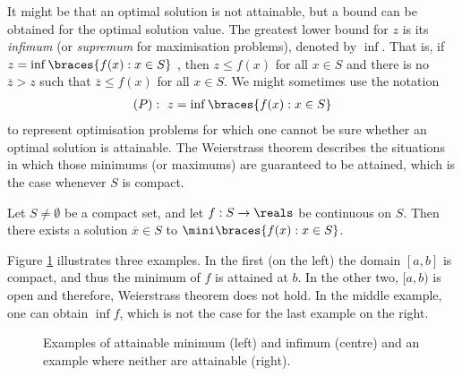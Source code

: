 It might be that an optimal solution is not attainable, but a bound can be obtained for the optimal solution value. The greatest lower bound for $z$ is its \emph{infimum} (or \emph{supremum} for maximisation problems), denoted by $\inf$. That is, if $z = \inf\braces{f(x) : x \in S}$ , then $z \leq f(x)$ for all $x \in S$ and there is no $\overline{z} > z$ such that $\overline{z} \leq f(x)$ for all $x \in S$. We might sometimes use the notation 
%
\begin{align*}
(P) :~ z = \inf\braces{f(x) : x \in S}
\end{align*}
%
to represent optimisation problems for which one cannot be sure whether an optimal solution is attainable. The Weierstrass theorem describes the situations in which those minimums (or maximums) are guaranteed to be attained, which is the case whenever $S$ is compact.
%
\begin{theorem}\label{thm:weierstrass}
Let $S \neq \emptyset$ be a compact set, and let $f:S \rightarrow \reals$ be continuous on $S$. Then there exists a solution $\overline{x} \in S$ to $\mini\braces{f(x) : x \in S}$. 
\end{theorem}
%
Figure \ref{fig:Weierstrass} illustrates three examples. In the first (on the left) the domain $[a,b]$ is compact, and thus the minimum of $f$ is attained at $b$. In the other two, $[a,b)$ is open and therefore, Weierstrass theorem does not hold. In the middle example, one can obtain $\inf f$, which is not the case for the last example on the right.
%
\begin{figure}[h]
	\caption{Examples of attainable minimum (left) and infimum (centre) and an example where neither are attainable (right).} \label{fig:Weierstrass}
\end{figure}


